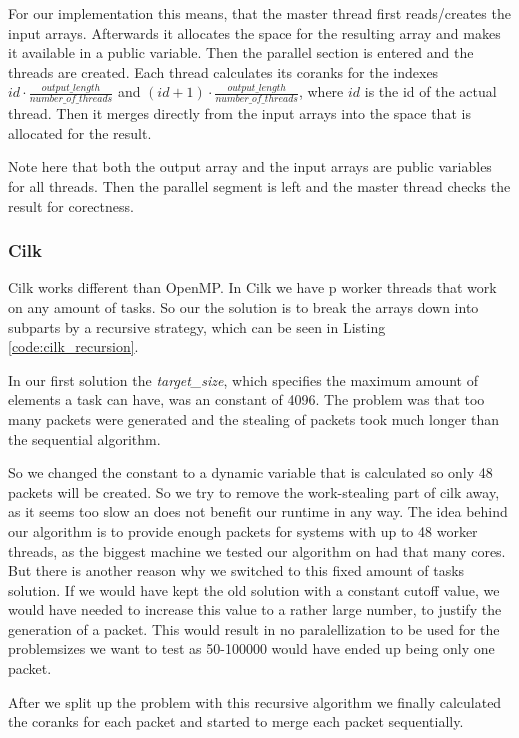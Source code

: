 For our implementation this means, that the master thread first reads/creates the input arrays.
Afterwards it allocates the space for the resulting array and makes it available in a public variable.
Then the parallel section is entered and the threads are created.
Each thread calculates its coranks for the indexes
$id \cdot \frac{output\_length}{number\_of\_threads}$
and
$(id+1)\cdot \frac{output\_length}{number\_of\_threads}$, where $id$ is the id of the actual thread.
Then it merges directly from the input arrays into the space that is allocated for the result.

Note here that both the output array and the input arrays are public variables for all threads.
Then the parallel segment is left and the master thread checks the result for corectness.


\subsubsection{Cilk}
Cilk works different than OpenMP. In Cilk we have p worker threads that work on any amount of tasks. So our the solution is to break the arrays down into subparts by a recursive strategy, which can be seen in Listing \ref{code:cilk_recursion}.

In our first solution the \textit{target\_size}, which specifies the maximum amount of elements a task can have, was an constant of 4096. The problem was that too many packets were generated and the stealing of packets took much longer than the sequential algorithm.

So we changed the constant to a dynamic variable that is calculated so only 48 packets will be created. So we try to remove the work-stealing part of cilk away, as it seems too slow an does not benefit our runtime in any way. The idea behind our algorithm is to provide enough packets for systems with up to 48 worker threads, as the biggest machine we tested our algorithm on had that many cores.
But there is another reason why we switched to this fixed amount of tasks solution. If we would have kept the old solution with a constant cutoff value, we would have needed to increase this value to a rather large number, to justify the generation of a packet. This would result in no paralellization to be used for the problemsizes we want to test as 50-100000 would have ended up being only one packet.

After we split up the problem with this recursive algorithm we finally calculated the coranks for each packet and started to merge each packet sequentially.

